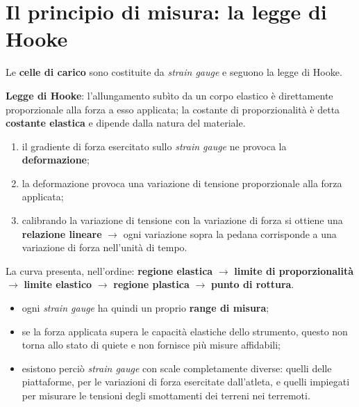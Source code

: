 \section{Il principio di misura: la legge di Hooke}

Le \textbf{celle di carico} sono costituite da \textit{strain gauge} e seguono la legge di Hooke.

\textbf{Legge di Hooke}: l'allungamento subìto da un corpo elastico è direttamente proporzionale
alla forza a esso applicata; la costante di proporzionalità è detta \textbf{costante elastica} e
dipende dalla natura del materiale.

\begin{enumerate}
  \item il gradiente di forza esercitato sullo \textit{strain gauge} ne provoca la
    \textbf{deformazione};
  \item la deformazione provoca una variazione di tensione proporzionale alla forza applicata;
  \item calibrando la variazione di tensione con la variazione di forza si ottiene una
    \textbf{relazione lineare} $\rightarrow$ ogni variazione sopra la pedana corrisponde a una
    variazione di forza nell'unità di tempo.
\end{enumerate}

La curva presenta, nell'ordine: \textbf{regione elastica} $\rightarrow$ \textbf{limite di
proporzionalità} $\rightarrow$ \textbf{limite elastico} $\rightarrow$ \textbf{regione plastica}
$\rightarrow$ \textbf{punto di rottura}.
\begin{itemize}
  \item ogni \textit{strain gauge} ha quindi un proprio \textbf{range di misura};
  \item se la forza applicata supera le capacità elastiche dello strumento, questo non torna allo
    stato di quiete e non fornisce più misure affidabili;
  \item esistono perciò \textit{strain gauge} con scale completamente diverse: quelli delle
    piattaforme, per le variazioni di forza esercitate dall'atleta, e quelli impiegati per misurare
    le tensioni degli smottamenti dei terreni nei terremoti.
\end{itemize}

